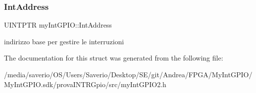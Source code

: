 \subsubsection{\texorpdfstring{Int\+Address}{IntAddress}}
{\footnotesize\ttfamily U\+I\+N\+T\+P\+TR my\+Int\+G\+P\+I\+O\+::\+Int\+Address}

indirizzo base per gestire le interruzioni 

The documentation for this struct was generated from the following file\+:\begin{DoxyCompactItemize}
\item 
/media/saverio/\+O\+S/\+Users/\+Saverio/\+Desktop/\+S\+E/git/\+Andrea/\+F\+P\+G\+A/\+My\+Int\+G\+P\+I\+O/\+My\+Int\+G\+P\+I\+O.\+sdk/prova\+I\+N\+T\+R\+Gpio/src/my\+Int\+G\+P\+I\+O2.\+h\end{DoxyCompactItemize}
